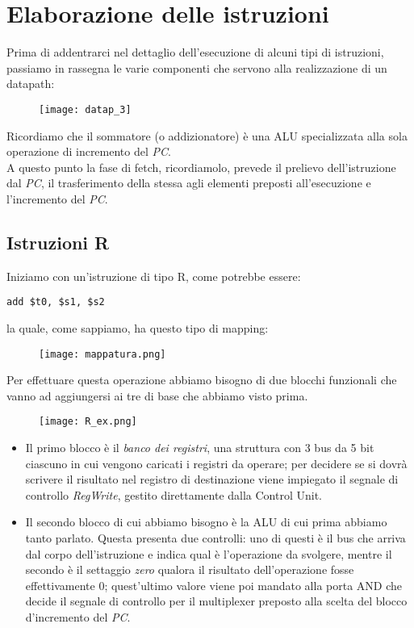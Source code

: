 \section{Elaborazione delle istruzioni}
Prima di addentrarci nel dettaglio dell'esecuzione di alcuni tipi di istruzioni, passiamo in rassegna le varie componenti che servono alla realizzazione di un datapath:
\begin{figure}[H]
	\centering
	\texttt{[image: datap\_3]}
\end{figure}
Ricordiamo che il sommatore (o addizionatore) è una ALU specializzata alla sola operazione di incremento del \emph{PC}.\\
A questo punto la fase di fetch, ricordiamolo, prevede il prelievo dell'istruzione dal \emph{PC}, il trasferimento della stessa agli elementi preposti all'esecuzione e l'incremento del \emph{PC}.

\subsection{Istruzioni R}
Iniziamo con un’istruzione di tipo R, come potrebbe essere:
\begin{verbatim}
add $t0, $s1, $s2
\end{verbatim}
la quale, come sappiamo, ha questo tipo di mapping:
\begin{figure}[H]
	\centering
	\texttt{[image: mappatura.png]}
\end{figure}
Per effettuare questa operazione abbiamo bisogno di due blocchi funzionali che vanno ad aggiungersi ai tre di base che abbiamo visto prima.
\begin{figure}[H]
	\centering
	\texttt{[image: R\_ex.png]}
\end{figure}
\begin{itemize}
	\item Il primo blocco è il \emph{banco dei registri}, una struttura con 3 bus da 5 bit ciascuno in cui vengono caricati i registri da operare; per decidere se si dovrà scrivere il risultato nel registro di destinazione viene impiegato il segnale di controllo \emph{RegWrite}, gestito direttamente dalla Control Unit.
	\item Il secondo blocco di cui abbiamo bisogno è la ALU di cui prima abbiamo tanto parlato. Questa presenta due controlli: uno di questi è il bus che arriva dal corpo dell'istruzione e indica qual è l'operazione da svolgere, mentre il secondo è il settaggio \emph{zero} qualora il risultato dell'operazione fosse effettivamente 0; quest'ultimo valore viene poi mandato alla porta AND che decide il segnale di controllo per il multiplexer preposto alla scelta del blocco d'incremento del \emph{PC}.
\end{itemize}

